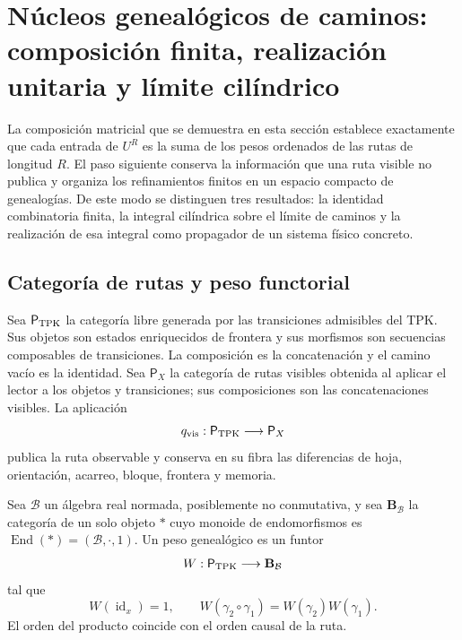 \section{Núcleos genealógicos de caminos: composición finita, realización unitaria y límite cilíndrico}
\label{x_reciprocidad:sec:integral-genealogica-caminos-rev2}

La composición matricial que se demuestra en esta sección establece exactamente que cada entrada de
\(U^R\) es la suma de los pesos ordenados de las rutas de longitud \(R\).
El paso siguiente conserva la información que una ruta visible no publica y
organiza los refinamientos finitos en un espacio compacto de genealogías. De
este modo se distinguen tres resultados: la identidad combinatoria finita, la
integral cilíndrica sobre el límite de caminos y la realización de esa
integral como propagador de un sistema físico concreto.

\subsection{Categoría de rutas y peso functorial}

Sea \(\mathsf P_{\rm TPK}\) la categoría libre generada por las transiciones
admisibles del TPK. Sus objetos son estados enriquecidos de frontera y sus
morfismos son secuencias composables de transiciones. La composición es la
concatenación y el camino vacío es la identidad. Sea \(\mathsf P_X\)
la categoría de rutas visibles obtenida al aplicar el lector a los
objetos y transiciones; sus composiciones son las concatenaciones visibles.
La aplicación
\[
 q_{\rm vis}:\mathsf P_{\rm TPK}\longrightarrow\mathsf P_X
\]
publica la ruta observable y conserva en su fibra las diferencias de hoja,
orientación, acarreo, bloque, frontera y memoria.

\begin{definition}
\label{x_reciprocidad:def:peso-genealogico-caminos-rev2}
Sea \(\mathcal B\) un álgebra real normada, posiblemente no conmutativa, y
sea \(\mathbf B_{\mathcal B}\) la categoría de un solo objeto \(\ast\) cuyo
monoide de endomorfismos es
\(\operatorname{End}(\ast)=(\mathcal B,\cdot,1)\). Un peso genealógico es un funtor
\[
 W:\mathsf P_{\rm TPK}\longrightarrow\mathbf B_{\mathcal B}
\]
tal que
\[
 W(\operatorname{id}_x)=1,
 \qquad
 W(\gamma_2\circ\gamma_1)=W(\gamma_2)W(\gamma_1).
\]
El orden del producto coincide con el orden causal de la ruta.
\end{definition}


